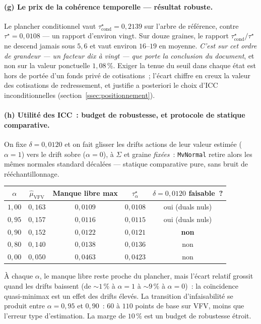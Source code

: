 \documentclass[11pt,letterpaper]{article}
\newcommand{\taustar}{\tau^{\star}}
\theoremstyle{definition}
\begin{document}
\paragraph{(g) Le prix de la cohérence temporelle --- résultat robuste.}
Le plancher conditionnel vaut $\taustar_{\mathrm{cond}} = 0{,}2139$ sur l'arbre
de référence, contre $\taustar = 0{,}0108$ --- un rapport d'environ vingt. Sur
douze graines, le rapport $\taustar_{\mathrm{cond}}/\taustar$ ne descend jamais
sous $5{,}6$ et vaut environ $16$--$19$ en moyenne. \emph{C'est sur cet ordre de
grandeur --- un facteur dix à vingt --- que porte la conclusion du document},
et non sur la valeur ponctuelle $1{,}08\,\%$. Exiger la tenue du seuil dans
chaque état est hors de portée d'un fonds privé de cotisations~; l'écart
chiffre en creux la valeur des cotisations de redressement, et justifie a
posteriori le choix d'ICC inconditionnelles
(section~\ref{ssec:positionnement}).

\paragraph{(h) Utilité des ICC~: budget de robustesse, et protocole de statique comparative.}
On fixe $\delta = 0{,}0120$ et on fait glisser les drifts actions de leur
valeur estimée ($\alpha = 1$) vers le drift sobre ($\alpha = 0$), à
$\Sigma$ et graine \emph{fixées}~: \texttt{MvNormal} retire alors les mêmes
normales standard décalées --- statique comparative pure, sans bruit de
rééchantillonnage.

\begin{center}
\begin{tabular}{ccccc}
\toprule
$\alpha$ & $\hat\mu_{\mathrm{VFV}}$ & Manque libre max & $\taustar_\alpha$ &
$\delta = 0{,}0120$ faisable~? \\
\midrule
$1{,}00$ & $0{,}163$ & $0{,}0109$ & $0{,}0108$ & oui (duals nuls) \\
$0{,}95$ & $0{,}157$ & $0{,}0116$ & $0{,}0115$ & oui (duals nuls) \\
$0{,}90$ & $0{,}152$ & $0{,}0122$ & $0{,}0121$ & \textbf{non} \\
$0{,}80$ & $0{,}140$ & $0{,}0138$ & $0{,}0136$ & non \\
$0{,}00$ & $0{,}050$ & $0{,}0463$ & $0{,}0423$ & non \\
\bottomrule
\end{tabular}
\end{center}

À chaque $\alpha$, le manque libre reste proche du plancher, mais l'écart
relatif grossit quand les drifts baissent (de $\sim 1\,\%$ à $\alpha = 1$ à
$\sim 9\,\%$ à $\alpha = 0$)~: la coïncidence quasi-minimax est un effet des
drifts élevés. La transition d'infaisabilité se produit entre $\alpha = 0{,}95$
et $0{,}90$~: $60$ à $110$ points de base sur VFV, moins que l'erreur type
d'estimation. La marge de $10\,\%$ est un budget de robustesse étroit.
\end{document}
